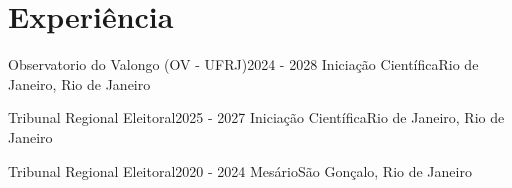\section{Experiência}
\resumeSubHeadingListStart

\resumeSubheading
    {Observatorio do Valongo (OV - UFRJ)}{2024 - 2028}
    {Iniciação Científica}{Rio de Janeiro, Rio de Janeiro}
    \resumeItemListStart
        
    \resumeItemListEnd

\resumeSubheading
    {Tribunal Regional Eleitoral}{2025 - 2027}
    {Iniciação Científica}{Rio de Janeiro, Rio de Janeiro}
    \resumeItemListStart
        
    \resumeItemListEnd

    
    \resumeSubheading
    {Tribunal Regional Eleitoral}{2020 - 2024}
    {Mesário}{São Gonçalo, Rio de Janeiro}
    \resumeItemListStart
        
    \resumeItemListEnd
    
     

\resumeSubHeadingListEnd
